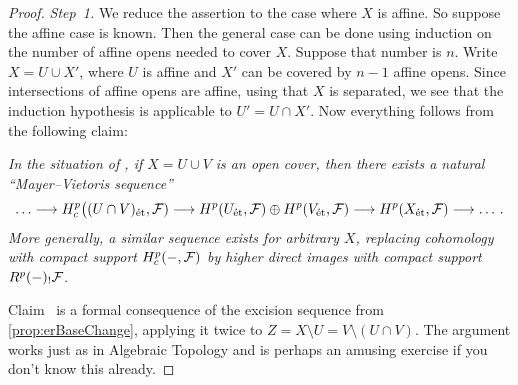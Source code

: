 \documentclass[a4paper, 10pt, oneside, DIV=9, chapterprefix=true, numbers=enddot, bibliography=totoc]{scrbook}
\begin{document}
\begin{proof}
	\emph{Step~1.} We reduce the assertion to the case where $X$ is affine. So suppose the affine case is known. Then the general case can be done using induction on the number of affine opens needed to cover $X$. Suppose that number is $n$. Write $X=U\cup X'$, where $U$ is affine and $X'$ can be covered by $n-1$ affine opens. Since intersections of affine opens are affine, using that $X$ is separated, we see that the induction hypothesis is applicable to $U'=U\cap X'$. Now everything follows from the following claim:
	\begin{alphanumerate}
		\item[\itememph{*}] \itshape In the situation of , if $X=U\cup V$ is an open cover, then there exists a natural \enquote{Mayer--Vietoris sequence}
		\begin{equation*}
			\dotso\morphism H_c^p\big((U\cap V)_\et,\Ff)\morphism H^p(U_\et,\Ff)\oplus H^p(V_\et,\Ff)\morphism H^p(X_\et,\Ff)\morphism \dotso\,.
		\end{equation*}
		More generally, a similar sequence exists for arbitrary $X$, replacing cohomology with compact support $H_c^p(-,\mathcal{F})$ by higher direct images with compact support $R^p(-)_!\mathcal{F}$.
	\end{alphanumerate}
	Claim~\itememph{*} is a formal consequence of the excision sequence from \cref{prop:erBaseChange}, applying it twice to $Z=X\setminus U=V\setminus(U\cap V)$. The argument works just as in Algebraic Topology and is perhaps an amusing exercise if you don't know this already.
	

\end{proof}
\end{document}
